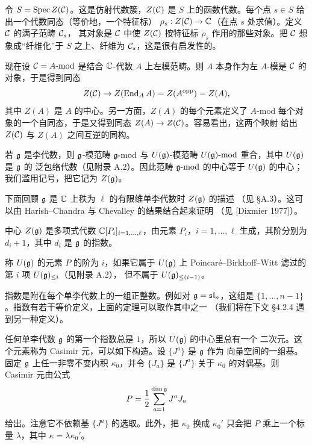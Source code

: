 令 $S=\operatorname{Spec} Z(\mathcal{C})$。这是仿射代数簇，$Z(\mathcal{C})$ 是 $S$ 上的函数代数。每个点
$s\in S$ 给出一个代数同态（等价地，一个特征标）
$\rho_s:Z(\mathcal{C})\to\mathbb{C}$（在点 $s$ 处求值）。定义 $\mathcal{C}$ 的满子范畴 $\mathcal{C}_s$，
其对象是 $\mathcal{C}$ 中使 $Z(\mathcal{C})$ 按特征标 $\rho_s$ 作用的那些对象。把 $\mathcal{C}$
想象成“纤维化”于 $S$ 之上、纤维为 $\mathcal{C}_s$，这是很有启发性的。

现在设 $\mathcal{C}=A\text{-}\mathrm{mod}$ 是结合 $\mathbb{C}$-代数 $A$ 上左模范畴。则 $A$
本身作为左 $A$-模是 $\mathcal{C}$ 的对象，于是得到同态
\[
    Z(\mathcal{C})\to Z(\operatorname{End}_A A)=Z(A^{\mathrm{opp}})=Z(A),
\]
其中 $Z(A)$ 是 $A$ 的中心。另一方面，$Z(A)$ 的每个元素定义了 $A\text{-}\mathrm{mod}$
每个对象的一个自同态，于是又得到同态 $Z(A)\to Z(\mathcal{C})$。容易看出，这两个映射
给出 $Z(\mathcal{C})$ 与 $Z(A)$ 之间互逆的同构。

若 $\mathfrak{g}$ 是李代数，则 $\mathfrak{g}$-模范畴 $\mathfrak{g}\text{-}\mathrm{mod}$ 与
$U(\mathfrak{g})$-模范畴 $U(\mathfrak{g})\text{-}\mathrm{mod}$ 重合，其中 $U(\mathfrak{g})$ 是 $\mathfrak{g}$ 的
泛包络代数（见附录 A.2）。因此范畴 $\mathfrak{g}\text{-}\mathrm{mod}$ 的中心等于
$U(\mathfrak{g})$ 的中心；我们滥用记号，把它记为 $Z(\mathfrak{g})$。

下面回顾 $\mathfrak{g}$ 是 $\mathbb{C}$ 上秩为 $\ell$ 的有限维单李代数时 $Z(\mathfrak{g})$ 的描述
（见 \S A.3）。这可以由 Harish--Chandra 与 Chevalley 的结果结合起来证明
（见 [Dixmier 1977]）。

\renewcommand{\thetheorem}{2.1.1}
\begin{theorem}
    中心 $Z(\mathfrak{g})$ 是多项式代数 $\mathbb{C}[P_i]_{i=1,\dots,\ell}$，由元素
    $P_i$，$i=1,\dots,\ell$ 生成，其阶分别为 $d_i+1$，其中 $d_i$ 是 $\mathfrak{g}$
    的指数。
\end{theorem}

称 $U(\mathfrak{g})$ 的元素 $P$ 的阶为 $i$，如果它属于 $U(\mathfrak{g})$ 上
Poincar\'e--Birkhoff--Witt 滤过的第 $i$ 项 $U(\mathfrak{g})_{\le i}$（见附录 A.2），
但不属于 $U(\mathfrak{g})_{\le(i-1)}$。

指数是附在每个单李代数上的一组正整数。例如对 $\mathfrak{g}=\mathfrak{sl}_n$，这组是
$\{1,\dots,n-1\}$。指数有若干等价定义，上面的定理可以取作其中之一
（我们将在下文 \S4.2.4 遇到另一种定义）。

任何单李代数 $\mathfrak{g}$ 的第一个指数总是 $1$，所以 $U(\mathfrak{g})$ 的中心里总有一个
二次元。这个元素称为 Casimir 元，可以如下构造。设 $\{J^a\}$ 是 $\mathfrak{g}$ 作为
向量空间的一组基。固定 $\mathfrak{g}$ 上任一非零不变内积 $\kappa_0$，并令 $\{J_a\}$
是 $\{J^a\}$ 关于 $\kappa_0$ 的对偶基。则 Casimir 元由公式
\[
    P=\frac12\sum_{a=1}^{\dim\mathfrak{g}}J^aJ_a
\]
给出。注意它不依赖基 $\{J^a\}$ 的选取。此外，把 $\kappa_0$ 换成
$\kappa_0'$ 只会把 $P$ 乘上一个标量 $\lambda$，其中
$\kappa=\lambda\kappa_0'$。

